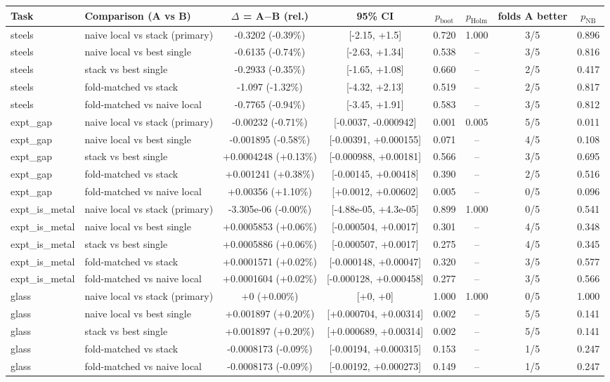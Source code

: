 \begin{tabular}{llcccccc}
\toprule
Task & Comparison (A vs B) & $\Delta$ = A$-$B (rel.) & 95\% CI & $p_\mathrm{boot}$ & $p_\mathrm{Holm}$ & folds A better & $p_\mathrm{NB}$ \\
\midrule
steels & naive local vs stack (primary) & -0.3202 (-0.39\%) & [-2.15, +1.5] & 0.720 & 1.000 & 3/5 & 0.896 \\
steels & naive local vs best single & -0.6135 (-0.74\%) & [-2.63, +1.34] & 0.538 & -- & 3/5 & 0.816 \\
steels & stack vs best single & -0.2933 (-0.35\%) & [-1.65, +1.08] & 0.660 & -- & 2/5 & 0.417 \\
steels & fold-matched vs stack & -1.097 (-1.32\%) & [-4.32, +2.13] & 0.519 & -- & 2/5 & 0.817 \\
steels & fold-matched vs naive local & -0.7765 (-0.94\%) & [-3.45, +1.91] & 0.583 & -- & 3/5 & 0.812 \\
\addlinespace
expt\_gap & naive local vs stack (primary) & -0.00232 (-0.71\%) & [-0.0037, -0.000942] & 0.001 & 0.005 & 5/5 & 0.011 \\
expt\_gap & naive local vs best single & -0.001895 (-0.58\%) & [-0.00391, +0.000155] & 0.071 & -- & 4/5 & 0.108 \\
expt\_gap & stack vs best single & +0.0004248 (+0.13\%) & [-0.000988, +0.00181] & 0.566 & -- & 3/5 & 0.695 \\
expt\_gap & fold-matched vs stack & +0.001241 (+0.38\%) & [-0.00145, +0.00418] & 0.390 & -- & 2/5 & 0.516 \\
expt\_gap & fold-matched vs naive local & +0.00356 (+1.10\%) & [+0.0012, +0.00602] & 0.005 & -- & 0/5 & 0.096 \\
\addlinespace
expt\_is\_metal & naive local vs stack (primary) & -3.305e-06 (-0.00\%) & [-4.88e-05, +4.3e-05] & 0.899 & 1.000 & 0/5 & 0.541 \\
expt\_is\_metal & naive local vs best single & +0.0005853 (+0.06\%) & [-0.000504, +0.0017] & 0.301 & -- & 4/5 & 0.348 \\
expt\_is\_metal & stack vs best single & +0.0005886 (+0.06\%) & [-0.000507, +0.0017] & 0.275 & -- & 4/5 & 0.345 \\
expt\_is\_metal & fold-matched vs stack & +0.0001571 (+0.02\%) & [-0.000148, +0.00047] & 0.320 & -- & 3/5 & 0.577 \\
expt\_is\_metal & fold-matched vs naive local & +0.0001604 (+0.02\%) & [-0.000128, +0.000458] & 0.277 & -- & 3/5 & 0.566 \\
\addlinespace
glass & naive local vs stack (primary) & +0 (+0.00\%) & [+0, +0] & 1.000 & 1.000 & 0/5 & 1.000 \\
glass & naive local vs best single & +0.001897 (+0.20\%) & [+0.000704, +0.00314] & 0.002 & -- & 5/5 & 0.141 \\
glass & stack vs best single & +0.001897 (+0.20\%) & [+0.000689, +0.00314] & 0.002 & -- & 5/5 & 0.141 \\
glass & fold-matched vs stack & -0.0008173 (-0.09\%) & [-0.00194, +0.000315] & 0.153 & -- & 1/5 & 0.247 \\
glass & fold-matched vs naive local & -0.0008173 (-0.09\%) & [-0.00192, +0.000273] & 0.149 & -- & 1/5 & 0.247 \\
\bottomrule
\end{tabular}
